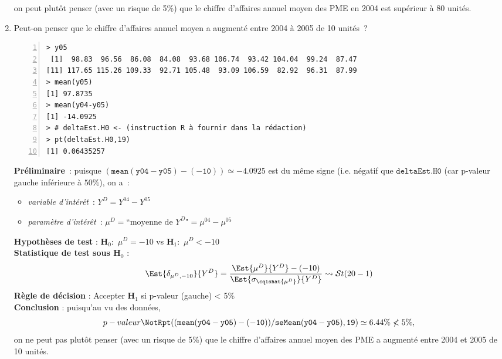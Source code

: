 \documentclass[10pt]{report}
\begin{document}
\begin{exercice}
\begin{enumerate}
\begin{Correction}
on peut plutôt penser (avec un risque de 5\%) que le chiffre d'affaires annuel moyen des PME en 2004 est supérieur à 80 unités.
\end{Correction}




\item Peut-on penser que le chiffre d'affaires annuel moyen a augmenté entre 2004 à 2005  de 10 unités~?

\IndicR
\begin{Verbatim}[frame=leftline,fontfamily=tt,fontshape=n,numbers=left]
> y05
 [1]  98.83  96.56  86.08  84.08  93.68 106.74  93.42 104.04  99.24  87.47
[11] 117.65 115.26 109.33  92.71 105.48  93.09 106.59  82.92  96.31  87.99
> mean(y05)
[1] 97.8735
> mean(y04-y05)
[1] -14.0925
> # deltaEst.H0 <- (instruction R à fournir dans la rédaction)
> pt(deltaEst.H0,19)
[1] 0.06435257
\end{Verbatim}

 

\begin{Correction}
\noindent \textbf{Préliminaire}~: puisque  $\mathtt{(mean(y04-y05)-(-10))}\simeq-4.0925$ est du même signe (i.e. négatif que $\mathtt{deltaEst.H0}$ (car p-valeur gauche inférieure à $50\%$), on a~:
    \begin{itemize}
\item \textit{variable d'intérêt}~: $Y^{D}=Y^{04}-Y^{05}$
\item \textit{paramètre d'intérêt}~: $\mu^{D}=\mbox{``moyenne de $Y^{D}$"}=\mu^{04}-\mu^{05}$
\end{itemize}
\noindent \textbf{Hypothèses de test} : $\mathbf{H}_0:$ $\mu^{D}=-10$ vs {\large $\mathbf{H}_1:$ $\mu^{D}<-10$}\\
\textbf{Statistique de test sous $\mathbf{H}_0$} :
  $$
  \Est{\delta_{\mu^{D},-10}}{Y^{D}}= {\displaystyle \frac{\Est{\mu^{D}}{Y^{D}}-(-10)}{
\Est{\sigma_{\cqlshat{\mu^{D}}}}{Y^{D}}
}} 
  \leadsto \mathcal{S}t(20-1)
  $$
\textbf{Règle de décision} : Accepter $\mathbf{H}_1$ si 
  p-valeur (gauche) < 5\%\\
\noindent \textbf{Conclusion} :
puisqu'au vu des données, 
  \[
p-valeur\NotR\mathtt{pt((mean(y04-y05)-(-10))/seMean(y04-y05),19)} \simeq 6.44\%\nless5\%,
\]
on ne peut pas plutôt penser (avec un risque de 5\%) que le chiffre d'affaires annuel moyen des PME a augmenté entre 2004 et 2005 de 10 unités.
\end{Correction}






\end{enumerate}
\end{exercice}
\end{document}
